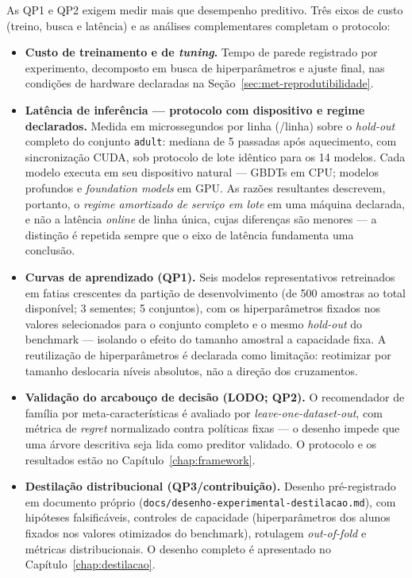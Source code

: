As QP1 e QP2 exigem medir mais que desempenho preditivo. Três eixos
de custo (treino, busca e latência) e as análises complementares
completam o protocolo:

\begin{itemize}
  \item \textbf{Custo de treinamento e de \emph{tuning}.} Tempo de parede
    registrado por experimento, decomposto em busca de hiperparâmetros e
    ajuste final, nas condições de hardware declaradas na
    Seção~\ref{sec:met-reprodutibilidade}.
  \item \textbf{Latência de inferência --- protocolo com dispositivo e
    regime declarados.} Medida em microssegundos por linha (\us/linha)
    sobre o \emph{hold-out} completo do conjunto \texttt{adult}: mediana de
    5 passadas após aquecimento, com sincronização CUDA, sob protocolo de
    lote idêntico para os 14 modelos. Cada modelo executa em seu
    dispositivo natural --- GBDTs em CPU; modelos profundos e
    \emph{foundation models} em GPU. As razões resultantes descrevem,
    portanto, o \emph{regime amortizado de serviço em lote} em uma máquina
    declarada, e não a latência \emph{online} de linha única, cujas
    diferenças são menores --- a distinção é repetida sempre que o eixo de
    latência fundamenta uma conclusão.
  \item \textbf{Curvas de aprendizado (QP1).} Seis modelos representativos
    retreinados em fatias crescentes da partição de desenvolvimento (de
    500 amostras ao total disponível; 3 sementes; 5 conjuntos), com os
    hiperparâmetros fixados nos valores selecionados para o conjunto
    completo e o mesmo \emph{hold-out} do benchmark --- isolando o efeito
    do tamanho amostral a capacidade fixa. A reutilização de hiperparâmetros é
    declarada como limitação: reotimizar por tamanho deslocaria níveis
    absolutos, não a direção dos cruzamentos.
  \item \textbf{Validação do arcabouço de decisão (LODO; QP2).} O
    recomendador de família por meta-características é avaliado por
    \emph{leave-one-dataset-out}, com métrica de \emph{regret} normalizado
    contra políticas fixas --- o desenho impede que uma árvore descritiva
    seja lida como preditor validado. O protocolo e os resultados estão no
    Capítulo~\ref{chap:framework}.
  \item \textbf{Destilação distribucional (QP3/contribuição).} Desenho
    pré-registrado em documento próprio
    (\texttt{docs/\allowbreak desenho-\allowbreak experimental-\allowbreak destilacao.\allowbreak md}), com hipóteses
    falsificáveis, controles de capacidade (hiperparâmetros dos alunos
    fixados nos valores otimizados do benchmark), rotulagem
    \emph{out-of-fold} e métricas distribucionais. O desenho completo é
    apresentado no Capítulo~\ref{chap:destilacao}.
\end{itemize}

